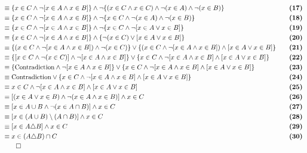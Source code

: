 \begin{alignat*}{2}
&\equiv \{x \in C \wedge \neg [x \in A \wedge x \in B]\} \wedge \neg \{(x \in C \wedge x \in C) \wedge \neg (x \in A) \wedge \neg (x \in B)\} && \quad \textbf{(17)}\\
&\equiv \{x \in C \wedge \neg [x \in A \wedge x \in B]\} \wedge \neg \{x \in C \wedge \neg (x \in A) \wedge \neg (x \in B)\} && \quad \textbf{(18)}\\
&\equiv \{x \in C \wedge \neg [x \in A \wedge x \in B]\} \wedge \neg \{x \in C \wedge \neg [x \in A \vee x \in B]\} && \quad \textbf{(19)}\\
&\equiv \{x \in C \wedge \neg [x \in A \wedge x \in B]\} \wedge \{\neg (x \in C) \vee [x \in A \vee x \in B]\} && \quad \textbf{(20)}\\
&\equiv \{(x \in C \wedge \neg [x \in A \wedge x \in B]) \wedge \neg (x \in C)\} \vee \{(x \in C \wedge \neg [x \in A \wedge x \in B]) \wedge [x \in A \vee x \in B]\} && \quad \textbf{(21)}\\
&\equiv \{[x \in C \wedge \neg (x \in C)] \wedge \neg [x \in A \wedge x \in B]\} \vee \{x \in C \wedge \neg [x \in A \wedge x \in B] \wedge [x \in A \vee x \in B]\} && \quad \textbf{(22)}\\
&\equiv \{\text{Contradiction} \wedge \neg [x \in A \wedge x \in B]\} \vee \{x \in C \wedge \neg [x \in A \wedge x \in B] \wedge [x \in A \vee x \in B]\} && \quad \textbf{(23)}\\
&\equiv \text{Contradiction} \vee \{x \in C \wedge \neg [x \in A \wedge x \in B] \wedge [x \in A \vee x \in B]\} && \quad \textbf{(24)}\\
&\equiv x \in C \wedge \neg [x \in A \wedge x \in B] \wedge [x \in A \vee x \in B] && \quad \textbf{(25)}\\
&\equiv [(x \in A \vee x \in B) \wedge \neg (x \in A \wedge x \in B)] \wedge x \in C && \quad \textbf{(26)}\\
&\equiv [x \in A \cup B \wedge \neg (x \in A \cap B)] \wedge x \in C && \quad \textbf{(27)}\\
&\equiv [x \in (A \cup B) \setminus (A \cap B)] \wedge x \in C && \quad \textbf{(28)}\\
&\equiv [x \in A \triangle B] \wedge x \in C && \quad \textbf{(29)}\\
&\equiv x \in (A \triangle B) \cap C && \quad \textbf{(30)}\\
&\qed
\end{alignat*}
\pagebreak

